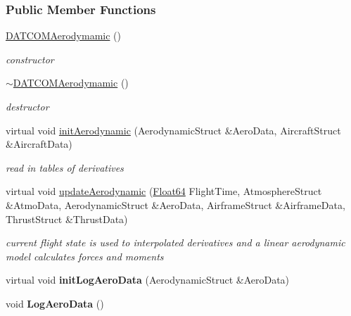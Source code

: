 \subsubsection*{Public Member Functions}
\begin{DoxyCompactItemize}
\item 
\mbox{\label{group___aerodynamic_a03d01a72cf389483e03e2bf6cce33299}} 
\hyperlink{group___aerodynamic_a03d01a72cf389483e03e2bf6cce33299}{D\+A\+T\+C\+O\+M\+Aerodymamic} ()
\begin{DoxyCompactList}\small\item\em constructor \end{DoxyCompactList}\item 
\mbox{\label{group___aerodynamic_a3619e38867cad4b0c8b06a939281a74e}} 
\hyperlink{group___aerodynamic_a3619e38867cad4b0c8b06a939281a74e}{$\sim$\+D\+A\+T\+C\+O\+M\+Aerodymamic} ()
\begin{DoxyCompactList}\small\item\em destructor \end{DoxyCompactList}\item 
\mbox{\label{group___aerodynamic_ab2d6d5df8505f3b1f1b8d74be820ca34}} 
virtual void \hyperlink{group___aerodynamic_ab2d6d5df8505f3b1f1b8d74be820ca34}{init\+Aerodynamic} (Aerodynamic\+Struct \&Aero\+Data, Aircraft\+Struct \&Aircraft\+Data)
\begin{DoxyCompactList}\small\item\em read in tables of derivatives \end{DoxyCompactList}\item 
\mbox{\label{group___aerodynamic_a589f8dbf43ca52f47581ca9caa53af8e}} 
virtual void \hyperlink{group___aerodynamic_a589f8dbf43ca52f47581ca9caa53af8e}{update\+Aerodynamic} (\hyperlink{group___tools_ga3f1431cb9f76da10f59246d1d743dc2c}{Float64} Flight\+Time, Atmosphere\+Struct \&Atmo\+Data, Aerodynamic\+Struct \&Aero\+Data, Airframe\+Struct \&Airframe\+Data, Thrust\+Struct \&Thrust\+Data)
\begin{DoxyCompactList}\small\item\em current flight state is used to interpolated derivatives and a linear aerodynamic model calculates forces and moments \end{DoxyCompactList}\item 
\mbox{\label{group___aerodynamic_ac0513ea8fdc1355a0427a15cfb4d8d9a}} 
virtual void {\bfseries init\+Log\+Aero\+Data} (Aerodynamic\+Struct \&Aero\+Data)
\item 
\mbox{\label{group___aerodynamic_a84ab90acbbec700e0b06272bf95cf932}} 
void {\bfseries Log\+Aero\+Data} ()
\end{DoxyCompactItemize}
